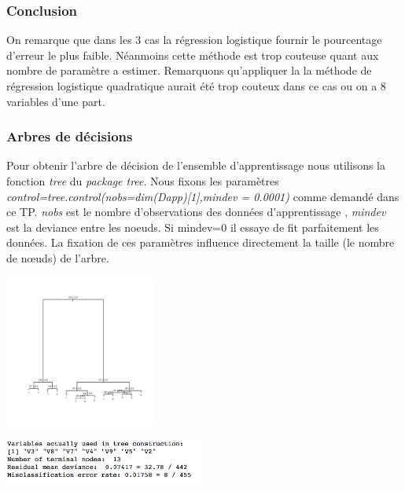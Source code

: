 \documentclass[10pt]{article}
\begin{document}
\subsubsection{Conclusion}
On remarque que dans les 3 cas la régression logistique fournir le pourcentage d'erreur le plus faible. Néanmoins cette méthode est trop couteuse quant aux nombre de paramètre a estimer. Remarquons qu'appliquer la la méthode de régression logistique quadratique aurait été trop couteux dans ce cas ou on a 8 variables d'une part. 

\subsubsection{Arbres de décisions}
Pour obtenir l'arbre de décision de l'ensemble d'apprentissage nous utilisons la fonction \textit{tree} du \textit{package tree}. Nous fixons les paramètres\\  \textit{control=tree.control(nobs=dim(Dapp)[1],mindev = 0.0001)}  comme demandé dans ce TP. \textit{nobs} est le nombre d'observations des données d'apprentissage , \textit{mindev} est la deviance entre les noeuds. Si mindev=0 il essaye de fit parfaitement les données. La fixation de ces paramètres influence directement la taille (le nombre de nœuds) de l'arbre.\\
\begin{minipage}{.5\textwidth}
	\includegraphics[width=50mm]{Figures/bcw_apptree.png}
\end{minipage}%
\hspace{0.001\linewidth}
\begin{minipage}{.5\textwidth}
	\includegraphics[width=65mm]{Figures/bcw_apptree_summary.png}
\end{minipage}
\end{document}
